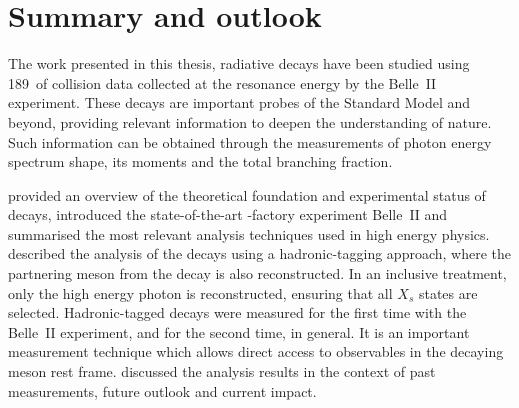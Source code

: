 \chapter{Summary and outlook}\label{ch:summary}

The work presented in this thesis, radiative \BtoXsgamma decays have been studied using 189~\invfb of \epem collision data collected at the \FourS resonance energy by the Belle~II experiment.
These decays are important probes of the Standard Model and beyond, providing relevant information to deepen the understanding of nature.
Such information can be obtained through the measurements of \BtoXsgamma photon energy spectrum shape, its moments and the total branching fraction.

 provided an overview of the theoretical foundation and experimental status of \mbox{\BtoXsgamma} decays, 
introduced the state-of-the-art \B-factory experiment Belle~II and summarised the most relevant analysis techniques used in high energy physics.
 described the analysis
of the \BtoXsgamma decays using a hadronic-tagging approach, where the partnering \B meson from the \FourS decay is also reconstructed.
In an inclusive treatment, only the high energy photon is reconstructed, ensuring that all $X_s$ states are selected.
Hadronic-tagged \BtoXsgamma decays were measured for the first time with the Belle~II experiment, and for the second time, in general.
It is an important measurement technique which allows direct access to observables in the decaying \B meson rest frame.
 discussed the analysis results in the context of past measurements, future outlook and current impact.

